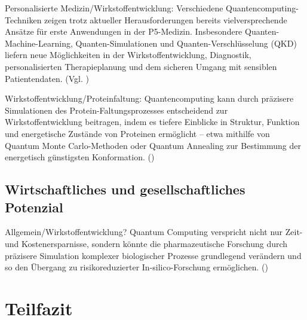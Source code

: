 Personalisierte Medizin/Wirkstoffentwicklung:
Verschiedene Quantencomputing-Techniken zeigen trotz aktueller Herausforderungen bereits vielversprechende Ansätze für erste Anwendungen in der P5-Medizin. Insbesondere Quanten-Machine-Learning, Quanten-Simulationen und Quanten-Verschlüsselung (QKD) liefern neue Möglichkeiten in der Wirkstoffentwicklung, Diagnostik, personalisierten Therapieplanung und dem sicheren Umgang mit sensiblen Patientendaten. (Vgl. \cite{bertl_quantum_2025})

Wirkstoffentwicklung/Proteinfaltung:
Quantencomputing kann durch präzisere Simulationen des Protein-Faltungsprozesses entscheidend zur Wirkstoffentwicklung beitragen, indem es tiefere Einblicke in Struktur, Funktion und energetische Zustände von Proteinen ermöglicht – etwa mithilfe von Quantum Monte Carlo-Methoden oder Quantum Annealing zur Bestimmung der energetisch günstigsten Konformation. (\cite{bertl_quantum_2025})

\subsection{Wirtschaftliches und gesellschaftliches Potenzial}
Allgemein/Wirkstoffentwicklung?
Quantum Computing verspricht nicht nur Zeit- und Kostenersparnisse, sondern könnte die pharmazeutische Forschung durch präzisere Simulation komplexer biologischer Prozesse grundlegend verändern und so den Übergang zu risikoreduzierter In-silico-Forschung ermöglichen. (\cite{dhande_quantum_2023})

\subsection{}




\section{Teilfazit}


\printbibliography
